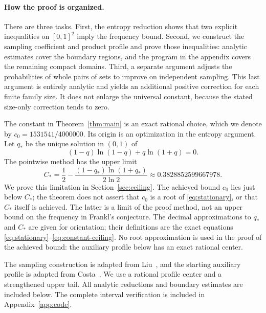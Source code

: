 \documentclass[11pt]{article}
\theoremstyle{remark}
\begin{document}
\paragraph{How the proof is organized.}
There are three tasks. First, the entropy reduction shows that two
explicit inequalities on \([0,1]^2\) imply the frequency bound.
Second, we construct the sampling coefficient and product profile and
prove those inequalities: analytic estimates cover the boundary
regions, and the program in the appendix covers the remaining compact
domains. Third, a separate argument adjusts the probabilities of whole
pairs of sets to improve on independent sampling. This last argument
is entirely analytic and yields an additional positive correction for
each finite family size. It does not enlarge the universal constant,
because the stated size-only correction tends to zero.



The constant in Theorem~\ref{thm:main} is an exact rational choice, which
we denote by \(c_0=1531541/4000000\). Its origin is an optimization
in the entropy argument. Let \(q_*\) be the unique solution in \((0,1)\) of
\begin{equation}\label{eq:stationary}
(1-q)\ln(1-q)+q\ln(1+q)=0.
\end{equation}
The pointwise method has the upper limit
\begin{equation}\label{eq:constant-ceiling}
C_*=\frac12-\frac{(1-q_*)\ln(1+q_*)}{2\ln2}
\approx0.3828852599667978.
\end{equation}
We prove this limitation in Section~\ref{sec:ceiling}.
The achieved bound \(c_0\) lies just below \(C_*\); the theorem does not
assert that \(c_0\) is a root of \eqref{eq:stationary}, or that \(C_*\)
itself is achieved. The latter is a limit of the proof method, not
an upper bound on the frequency in Frankl's conjecture.
The decimal approximations to \(q_*\) and \(C_*\) are given for
orientation; their definitions are the exact equations
\eqref{eq:stationary}--\eqref{eq:constant-ceiling}.
No root approximation is used in the proof of the achieved bound:
the auxiliary profile below has an exact rational center.

The sampling construction is adapted from Liu~\cite{liu}, and the
starting auxiliary profile is adapted from Costa~\cite{costa}.
We use a rational profile center and a strengthened upper tail.
All analytic reductions and boundary estimates are included below.
The complete interval verification is included in Appendix~\ref{app:code}.
\end{document}
